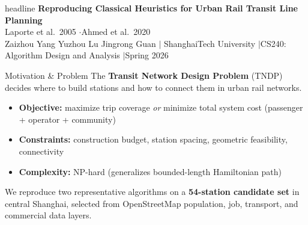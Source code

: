 \documentclass[final]{beamer}
\begin{document}
\begin{frame}[t]
\vspace{-0.5cm}

\begin{beamercolorbox}[wd=\paperwidth, center, sep=0.6cm]{headline}
{\fontsize{52}{58}\selectfont\bfseries\color{white} Reproducing Classical Heuristics for Urban Rail Transit Line Planning}\\[0.2cm]
{\fontsize{24}{28}\selectfont\color{white} Laporte et al.\ 2005 \quad$\cdot$\quad Ahmed et al.\ 2020}\\[0.12cm]
{\fontsize{16}{20}\selectfont\color{white} Zaizhou Yang \quad Yuzhou Lu \quad Jingrong Guan \quad$\vert$\quad
ShanghaiTech University \quad$\vert$\quad CS240: Algorithm Design and Analysis \quad$\vert$\quad Spring 2026}
\end{beamercolorbox}

\vspace{0.2cm}

\noindent
\begin{minipage}[t]{0.48\paperwidth}\normalsize

\begin{block}{\Large Motivation \& Problem}
\normalsize
The \textbf{Transit Network Design Problem} (TNDP) decides where to build stations and how to connect them in urban rail networks.
\begin{itemize}[leftmargin=*, label=\textcolor{shanghaitech}{$\blacktriangleright$}, itemsep=0.08em, parsep=0pt]
    \item \textbf{Objective:} maximize trip coverage \emph{or} minimize total system cost (passenger + operator + community)
    \item \textbf{Constraints:} construction budget, station spacing, geometric feasibility, connectivity
    \item \textbf{Complexity:} NP-hard (generalizes bounded-length Hamiltonian path)
\end{itemize}
We reproduce two representative algorithms on a \textbf{54-station candidate set} in central Shanghai, selected from OpenStreetMap population, job, transport, and commercial data layers.
\end{block}

\vspace{0.15cm}


\end{minipage}
\end{frame}
\end{document}
